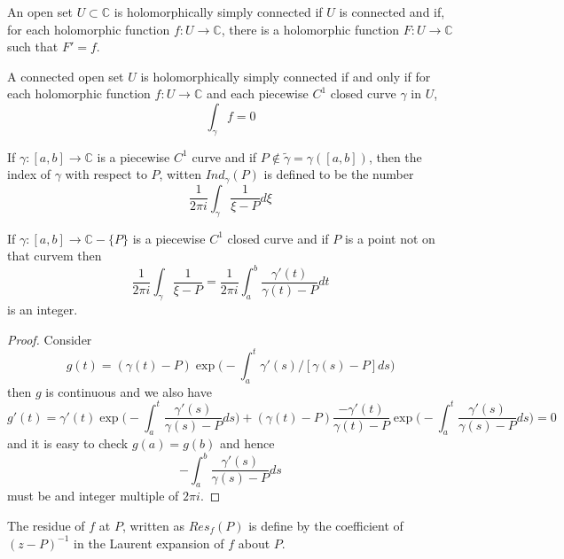 \documentclass[lang=en, color=blue, ]{elegantbook}
\newcommand{\C}{\mathbb{C}}
\begin{document}
\begin{definition}
    An open set $U\subset \C$ is holomorphically simply connected if $U$ is connected and if, for each holomorphic function $f:U\to\C$, there is a holomorphic function $F:U\to\C$ such that $F'=f$.
\end{definition}

\begin{lemma}
    A connected open set $U$ is holomorphically simply connected if and only if for each holomorphic function $f:U\to\C$ and each piecewise $C^1$ closed curve $\gamma$ in $U$,
    \[
    \int_{\gamma} f = 0
    \]
\end{lemma}

\begin{definition}
    If $\gamma:[a,b]\to\C$ is a piecewise $C^1$ curve and if $P\notin \tilde{\gamma} = \gamma([a,b])$, then the index of $\gamma$ with respect to $P$, witten $Ind_{\gamma}(P)$ is defined to be the number
    \[\dfrac{1}{2\pi i}\int_{\gamma}\dfrac{1}{\xi-P}d\xi\]
\end{definition}

\begin{lemma}
    If $\gamma:[a,b]\to\C-\{P\}$ is a piecewise $C^1$ closed curve and if $P$ is a point not on that curvem then
    \[
    \dfrac{1}{2\pi i }\int_{\gamma}\dfrac{1}{\xi-P} = \dfrac{1}{2\pi i}\int_a^b\dfrac{\gamma'(t)}{\gamma(t)-P}dt
    \]
    is an integer.
\end{lemma}
\begin{proof}\par
    Consider
    \[
    g(t) = (\gamma(t)-P)\exp{\Big(-\int_a^t\gamma'(s)/[\gamma(s)-P]ds\Big)} 
    \]
    then $g$ is continuous and we also have
    \[
    g'(t) = \gamma'(t)\exp{\Big(-\int_a^t \dfrac{\gamma'(s)}{\gamma(s)-P}ds\Big)} + (\gamma(t)-P)\dfrac{-\gamma'(t)}{\gamma(t)-P}\exp{\Big(-\int_a^t\dfrac{\gamma'(s)}{\gamma(s)-P}ds\Big)} = 0
    \]
    and it is easy to check $g(a) = g(b)$ and hence
    \[
    -\int_a^b \dfrac{\gamma'(s)}{\gamma(s)-P}ds
    \]
    must be and integer multiple of $2\pi i$.
\end{proof}

\begin{definition}
    The residue of $f$ at $P$, written as $Res_f(P)$ is define by the coefficient of $(z-P)^{-1}$ in the Laurent expansion of $f$ about $P$.
\end{definition}
\end{document}
